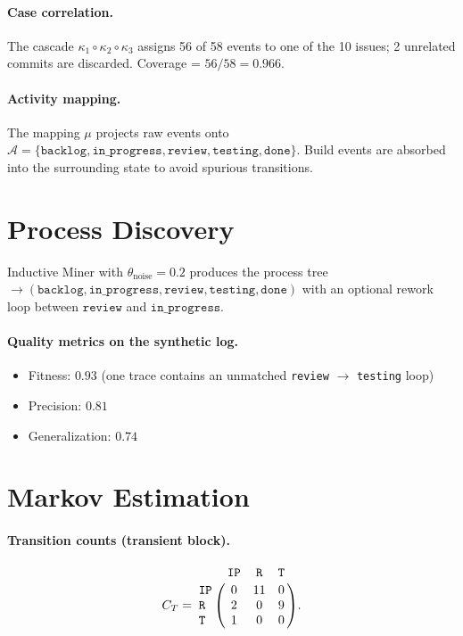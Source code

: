 \paragraph{Case correlation.} The cascade $\kappa_1 \circ \kappa_2 \circ
\kappa_3$ assigns 56 of 58 events to one of the 10 issues; 2 unrelated
commits are discarded. Coverage = $56/58 = 0.966$.

\paragraph{Activity mapping.} The mapping $\mu$ projects raw events onto
$\mathcal{A} = \{\mathtt{backlog}, \mathtt{in\_progress},
\mathtt{review}, \mathtt{testing}, \mathtt{done}\}$. Build events are
absorbed into the surrounding state to avoid spurious transitions.


\section{Process Discovery}
\label{app:J-discovery}

Inductive Miner with $\theta_{\text{noise}} = 0.2$ produces the process
tree
$\to(\mathtt{backlog}, \mathtt{in\_progress}, \mathtt{review},
   \mathtt{testing}, \mathtt{done})$
with an optional rework loop between $\mathtt{review}$ and
$\mathtt{in\_progress}$.

\paragraph{Quality metrics on the synthetic log.}
\begin{itemize}
  \item Fitness: $0.93$ (one trace contains an unmatched
    \texttt{review} $\to$ \texttt{testing} loop)
  \item Precision: $0.81$
  \item Generalization: $0.74$
\end{itemize}


\section{Markov Estimation}
\label{app:J-markov}

\paragraph{Transition counts (transient block).}
\begin{equation*}
C_T = \bordermatrix{
   & \mathtt{IP} & \mathtt{R} & \mathtt{T} \cr
\mathtt{IP} & 0 & 11 & 0 \cr
\mathtt{R}  & 2 & 0  & 9 \cr
\mathtt{T}  & 1 & 0  & 0 \cr}.
\end{equation*}

